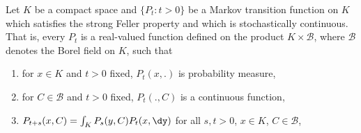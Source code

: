 \begin{example}\label{ex:b4-2.6}
Let $K$ be a compact space and $\{P_t \colon t > 0\}$ be a
Markov transition function on $K$ which satisfies the strong Feller
property and which is stochastically continuous.
That is, every
$P_t$ is a real-valued function defined on the product $K \times \mathcal{B}$, where $\mathcal{B}$
denotes the Borel field on $K$, such that
\begin{enumerate}[\upshape (i)]
    \item 
    for $x \in K$ and $t > 0$ fixed, $P_t(x,.)$ is probability measure,

    \item 
    for $C \in \mathcal{B}$ and $t > 0$ fixed, $P_t(.,C)$ is a continuous function,

    \item 
    $P_{t+s}(x,C) = \int_K P_s(y,C)P_t(x,\dy)$ for all $s,t > 0$, $x \in K$, $C \in \mathcal{B}$,


\end{enumerate}
\end{example}
